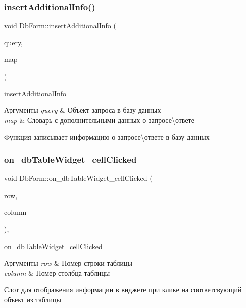 \subsubsection{\texorpdfstring{insert\+Additional\+Info()}{insertAdditionalInfo()}}
{\footnotesize\ttfamily void Db\+Form\+::insert\+Additional\+Info (\begin{DoxyParamCaption}\item[{Q\+Sql\+Query \&}]{query,  }\item[{const \hyperlink{dbform_8h_a1ec1a645f41e1c6544d384ca863a936c}{add\+Info\+Map} \&}]{map }\end{DoxyParamCaption})\hspace{0.3cm}{\ttfamily [private]}}



insert\+Additional\+Info 


\begin{DoxyParams}{Аргументы}
{\em query} & Объект запроса в базу данных \\
\hline
{\em map} & Словарь с дополнительными данных о запросе\textbackslash{}ответе\\
\hline
\end{DoxyParams}
Функция записывает информацию о запросе\textbackslash{}ответе в базу данных \mbox{\label{classDbForm_ae26fa6d6d1be86e8fff9766d64392fdd}} 
\subsubsection{\texorpdfstring{on\+\_\+db\+Table\+Widget\+\_\+cell\+Clicked}{on\_dbTableWidget\_cellClicked}}
{\footnotesize\ttfamily void Db\+Form\+::on\+\_\+db\+Table\+Widget\+\_\+cell\+Clicked (\begin{DoxyParamCaption}\item[{int}]{row,  }\item[{int}]{column }\end{DoxyParamCaption})\hspace{0.3cm}{\ttfamily [private]}, {\ttfamily [slot]}}



on\+\_\+db\+Table\+Widget\+\_\+cell\+Clicked 


\begin{DoxyParams}{Аргументы}
{\em row} & Номер строки таблицы \\
\hline
{\em column} & Номер столбца таблицы\\
\hline
\end{DoxyParams}
Слот для отображения информации в виджете при клике на соответсвующий объект из таблицы \mbox{\label{classDbForm_aa1f2f6562e51324bb3dc453f9579380b}} 
